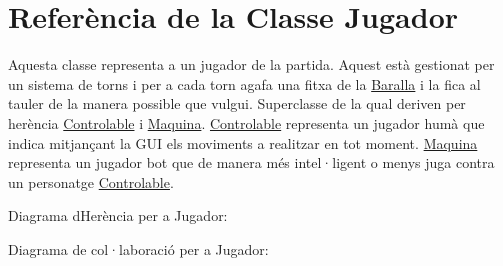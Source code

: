 \hypertarget{class_jugador}{}\section{Referència de la Classe Jugador}
\label{class_jugador}


Aquesta classe representa a un jugador de la partida. Aquest està gestionat per un sistema de torns i per a cada torn agafa una fitxa de la \mbox{\hyperlink{class_baralla}{Baralla}} i la fica al tauler de la manera possible que vulgui. Superclasse de la qual deriven per herència \mbox{\hyperlink{class_controlable}{Controlable}} i \mbox{\hyperlink{class_maquina}{Maquina}}. \mbox{\hyperlink{class_controlable}{Controlable}} representa un jugador humà que indica mitjançant la G\+UI els moviments a realitzar en tot moment. \mbox{\hyperlink{class_maquina}{Maquina}} representa un jugador bot que de manera més intel·ligent o menys juga contra un personatge \mbox{\hyperlink{class_controlable}{Controlable}}.  




Diagrama d\textquotesingle{}Herència per a Jugador\+:


Diagrama de col·laboració per a Jugador\+:

